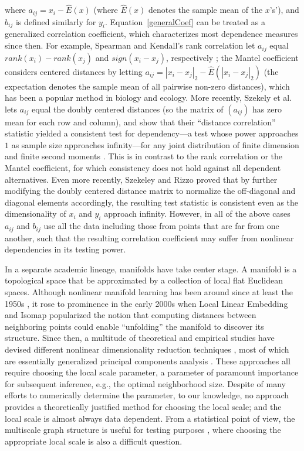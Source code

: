 \documentclass[11pt]{article}
\begin{document}
where $a_{ij}=x_i - \hat{E}(x)$ (where $\hat{E}(x)$ denotes the sample mean of the $x$'s'), and $b_{ij}$ is defined similarly for $y_i$.  Equation~\ref{generalCoef} can be treated as a generalized correlation coefficient, which characterizes most dependence measures since then.  For example, Spearman and Kendall's rank correlation let $a_{ij}$ equal $rank(x_i)-rank(x_j)$ and $sign(x_i-x_j)$, respectively \cite{KendallBook}; the Mantel coefficient \cite{Mantel1967} considers centered distances by letting $a_{ij}=|x_i-x_j|_{2}-\hat{E}(|x_i-x_j|_{2})$ (the expectation denotes the sample mean of all pairwise non-zero distances), which has been a popular method in biology and ecology. More recently, Szekely et al. \cite{SzekelyRizzoBakirov2007} lets $a_{ij}$ equal the doubly centered distances (so the matrix of $(a_{ij})$ has zero mean for each row and column), and show that their ``distance correlation'' statistic yielded a consistent test for dependency---a test whose power approaches $1$ as sample size approaches infinity---for any joint distribution of finite dimension and finite second moments \cite{SzekelyRizzo2009}. This is in contrast to the rank correlation or the Mantel coefficient, for which consistency does not hold against all dependent alternatives. 
Even more recently, Szekeley and Rizzo \cite{SzekelyRizzo2013a} proved that by further modifying the doubly centered distance matrix to normalize the off-diagonal and diagonal elements accordingly, the resulting test statistic is consistent even as the dimensionality of $x_{i}$ and $y_{i}$ approach infinity.  However, in all of the above cases $a_{ij}$ and $b_{ij}$ use all the data including those from points that are far from one another, such that the resulting correlation coefficient may suffer from nonlinear dependencies in its testing power.

In a separate academic lineage, manifolds have take center stage.  A manifold is a topological space that be approximated by a collection of local flat Euclidean spaces.  Although nonlinear manifold learning has been around since at least the 1950s \cite{TorgersonBook}, it rose to prominence in the early 2000s when Local Linear Embedding \cite{SaulRoweis2000} and Isomap \cite{TenenbaumSilvaLangford2000} popularized the notion that computing distances between neighboring points could enable ``unfolding'' the manifold to discover its structure.  Since then, a multitude of theoretical and empirical studies have devised different nonlinear dimensionality reduction techniques \cite{LeeVerleysen2007}, most of which are essentially generalized principal components analysis \cite{ScholkopfSmolaMuller1999}.  These approaches all require choosing the local scale parameter, a parameter of paramount importance for subsequent inference, e.g., the optimal neighborhood size. Despite of many efforts to numerically determine the parameter, to our knowledge, no approach provides a theoretically justified method for choosing the local scale; and the local scale is almost always data dependent. From a statistical point of view, the multiscale graph structure is useful for testing purposes \cite{David1966,Friedman1983,Schilling1986,Dumcke2014}, where choosing the appropriate local scale is also a difficult question.
\end{document}
